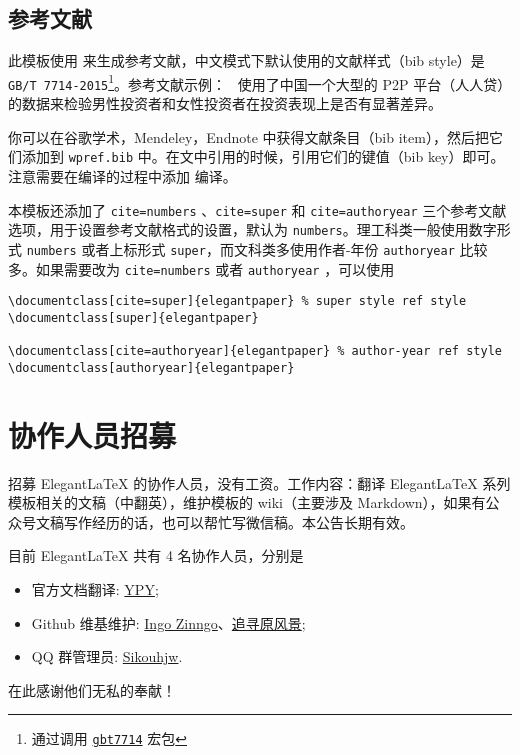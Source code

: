 \documentclass[lang=cn,11pt,a4paper]{elegantpaper}
\begin{document}
\subsection{参考文献}
此模板使用  来生成参考文献，中文模式下默认使用的文献样式（bib style）是 \lstinline{GB/T 7714-2015}\footnote{通过调用 \href{https://ctan.org/pkg/gbt7714}{\lstinline{gbt7714}} 宏包}。参考文献示例：~\cite{en3} 使用了中国一个大型的 P2P 平台（人人贷）的数据来检验男性投资者和女性投资者在投资表现上是否有显著差异。

你可以在谷歌学术，Mendeley，Endnote 中获得文献条目（bib item），然后把它们添加到 \lstinline{wpref.bib} 中。在文中引用的时候，引用它们的键值（bib key）即可。注意需要在编译的过程中添加  编译。

本模板还添加了 \lstinline{cite=numbers} 、\lstinline{cite=super} 和 \lstinline{cite=authoryear}  三个参考文献选项，用于设置参考文献格式的设置，默认为 \lstinline{numbers}。理工科类一般使用数字形式 \lstinline{numbers} 或者上标形式 \lstinline{super}，而文科类多使用作者-年份 \lstinline{authoryear} 比较多。如果需要改为 \lstinline{cite=numbers}  或者  \lstinline{authoryear} ，可以使用
\begin{lstlisting}
\documentclass[cite=super]{elegantpaper} % super style ref style
\documentclass[super]{elegantpaper}

\documentclass[cite=authoryear]{elegantpaper} % author-year ref style
\documentclass[authoryear]{elegantpaper}
\end{lstlisting}


\section{协作人员招募}
招募 Elegant\LaTeX{} 的协作人员，没有工资。工作内容：翻译 Elegant\LaTeX{} 系列模板相关的文稿（中翻英），维护模板的 wiki（主要涉及 Markdown），如果有公众号文稿写作经历的话，也可以帮忙写微信稿。本公告长期有效。

目前 ElegantLaTeX 共有 4 名协作人员，分别是
\begin{itemize}
  \item 官方文档翻译: \href{https://github.com/peggy2006xzyz}{YPY};
  \item Github 维基维护: \href{https://github.com/izinngo}{Ingo Zinngo}、\href{https://github.com/xiaohao890809}{追寻原风景};
  \item QQ 群管理员: \href{https://github.com/sikouhjw}{Sikouhjw}.
\end{itemize}

在此感谢他们无私的奉献！
\end{document}
